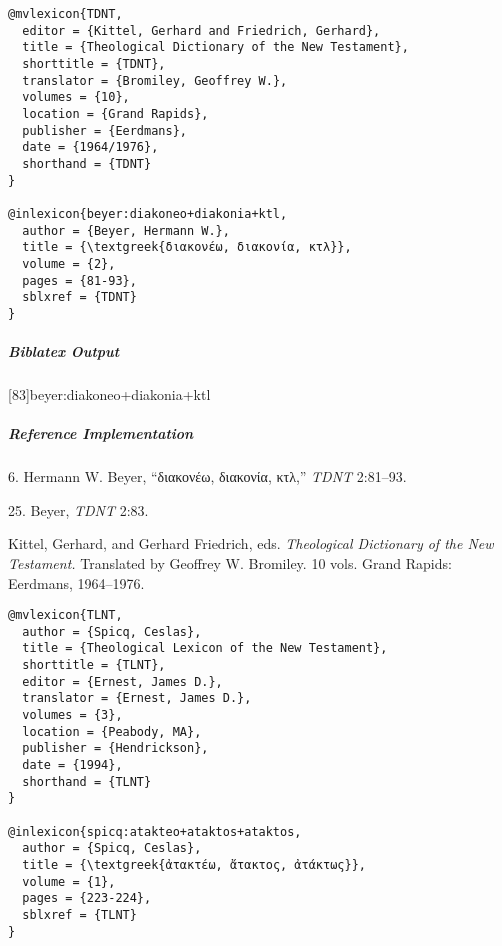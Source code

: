 \documentclass[a4paper]{article}
\newcommand{\textgreek}[1]{{\greekfont #1}}
\newenvironment{biboutput}{%
  \subparagraph{Biblatex Output}
}{\color{black}}
\newenvironment{refimp}{%
  \subparagraph{Reference Implementation}
  \color{reference-colour}
  \rm
}{\par\color{black}}
\begin{document}
\medskip

\begin{lstlisting}
@mvlexicon{TDNT,
  editor = {Kittel, Gerhard and Friedrich, Gerhard},
  title = {Theological Dictionary of the New Testament},
  shorttitle = {TDNT},
  translator = {Bromiley, Geoffrey W.},
  volumes = {10},
  location = {Grand Rapids},
  publisher = {Eerdmans},
  date = {1964/1976},
  shorthand = {TDNT}
}

@inlexicon{beyer:diakoneo+diakonia+ktl,
  author = {Beyer, Hermann W.},
  title = {\textgreek{διακονέω, διακονία, κτλ}},
  volume = {2},
  pages = {81-93},
  sblxref = {TDNT}
}
\end{lstlisting}
  
\begin{biboutput}
  [83]{beyer:diakoneo+diakonia+ktl}
\end{biboutput}

\begin{refimp}
  \hspace*{\bibindent}6. Hermann W. Beyer, “\textgreek{διακονέω, διακονία, κτλ},”
  \emph{TDNT} 2:81–93.

  \hspace*{\bibindent}25. Beyer, \emph{TDNT} 2:83.

  \hangindent\bibindent Kittel, Gerhard, and Gerhard Friedrich, eds.
  \emph{Theological Dictionary of the New Testament.} Translated by Geoffrey
  W. Bromiley. 10 vols. Grand Rapids: Eerdmans, 1964–1976.

\end{refimp}

\medskip

\begin{lstlisting}
@mvlexicon{TLNT,
  author = {Spicq, Ceslas},
  title = {Theological Lexicon of the New Testament},
  shorttitle = {TLNT},
  editor = {Ernest, James D.},
  translator = {Ernest, James D.},
  volumes = {3},
  location = {Peabody, MA},
  publisher = {Hendrickson},
  date = {1994},
  shorthand = {TLNT}
}

@inlexicon{spicq:atakteo+ataktos+ataktos,
  author = {Spicq, Ceslas},
  title = {\textgreek{ἀτακτέω, ἄτακτος, ἀτάκτως}},
  volume = {1},
  pages = {223-224},
  sblxref = {TLNT}
}
\end{lstlisting}
\end{document}
